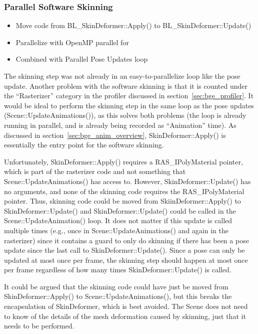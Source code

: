

\subsubsection{Parallel Software Skinning}
\label{sec:parallel_software_skinning}
\ifsummaries
\begin{itemize}
 \item Move code from BL\_SkinDeformer::Apply() to BL\_SkinDeformer::Update()
 \item Parallelize with OpenMP parallel for
 \item Combined with Parallel Pose Updates loop
\end{itemize}
\fi

The skinning step was not already in an easy-to-parallelize loop like the pose update.
Another problem with the software skinning is that it is counted under the ``Rasterizer'' category in the profiler discussed in section~\ref{sec:bge_profiler}.
It would be ideal to perform the skinning step in the same loop as the pose updates (Scene::UpdateAnimations()), as this solves both problems (the loop is already running in parallel, and is already being recorded as ``Animation'' time).
As discussed in section~\ref{sec:bge_anim_overview}, SkinDeformer::Apply() is essentially the entry point for the software skinning.

Unfortunately, SkinDeformer::Apply() requires a RAS\_IPolyMaterial pointer, which is part of the rasterizer code and not something that Scene::UpdateAnimations() has access to.
However, SkinDeformer::Update() has no arguments, and none of the skinning code requires the RAS\_IPolyMaterial pointer.
Thus, skinning code could be moved from SkiinDeformer::Apply() to SkinDeformer::Update() and SkinDeformer::Update() could be called in the Scene::UpdateAnimation() loop.
It does not matter if this update is called multiple times (e.g., once in Scene::UpdateAnimations() and again in the rasterizer) since it contains a guard to only do skinning if there has been a pose update since the last call to SkinDeformer::Update().
Since a pose can only be updated at most once per frame, the skinning step should happen at most once per frame regardless of how many times SkinDeformer::Update() is called.

It could be argued that the skinning code could have just be moved from SkinDeformer::Apply() to Scene::UpdateAnimations(), but this breaks the encapsulation of SkinDeformer, which is best avoided.
The Scene does not need to know of the details of the mesh deformation caused by skinning, just that it needs to be performed.

